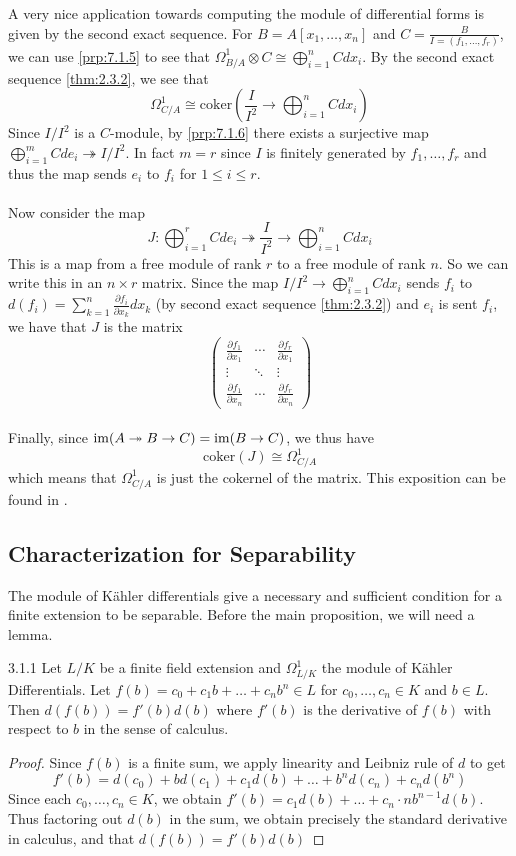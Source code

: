 \documentclass[a4paper]{article}
\begin{document}
A very nice application towards computing the module of differential forms is given by the second exact sequence. For $B=A[x_1,\dots,x_n]$ and $C=\frac{B}{I=(f_1,\dots,f_r)}$, we can use \ref{prp:7.1.5} to see that $\Omega_{B/A}^1\otimes C\cong\bigoplus_{i=1}^nCdx_i$. By the second exact sequence \ref{thm:2.3.2}, we see that $$\Omega_{C/A}^1\cong\text{coker}\left(\frac{I}{I^2}\to\bigoplus_{i=1}^nCdx_i\right)$$ Since $I/I^2$ is a $C$-module, by \ref{prp:7.1.6} there exists a surjective map $\bigoplus_{i=1}^mCde_i\twoheadrightarrow I/I^2$. In fact $m=r$ since $I$ is finitely generated by $f_1,\dots,f_r$ and thus the map sends $e_i$ to $f_i$ for $1\leq i\leq r$. \\~\\

Now consider the map $$J:\bigoplus_{i=1}^rCde_i\twoheadrightarrow\frac{I}{I^2}\rightarrow\bigoplus_{i=1}^nCdx_i$$ This is a map from a free module of rank $r$ to a free module of rank $n$. So we can write this in an $n\times r$ matrix. Since the map $I/I^2\to\bigoplus_{i=1}^nCdx_i$ sends $f_i$ to $d(f_i)=\sum_{k=1}^n\frac{\partial f_i}{\partial x_k}dx_k$ (by second exact sequence \ref{thm:2.3.2}) and $e_i$ is sent $f_i$, we have that $J$ is the matrix $$\begin{pmatrix}
\frac{\partial f_1}{\partial x_1} & \cdots & \frac{\partial f_r}{\partial x_1}\\
\vdots & \ddots & \vdots\\
\frac{\partial f_1}{\partial x_n} & \cdots & \frac{\partial f_r}{\partial x_n}
\end{pmatrix}$$~\\

Finally, since $\operatorname{im}(A\twoheadrightarrow B\to C)=\operatorname{im}(B\to C)$, we thus have $$\text{coker}(J)\cong\Omega_{C/A}^1$$ which means that $\Omega_{C/A}^1$ is just the cokernel of the matrix. This exposition can be found in \cite{Dav}. 

\subsection{Characterization for Separability}
The module of Kähler differentials give a necessary and sufficient condition for a finite extension to be separable. Before the main proposition, we will need a lemma. 

\begin{lmm}{}{3.1.1} Let $L/K$ be a finite field extension and $\Omega_{L/K}^1$ the module of Kähler Differentials. Let $f(b)=c_0+c_1b+\dots+c_nb^n\in L$ for $c_0,\dots,c_n\in K$ and $b\in L$. Then $d(f(b))=f'(b)d(b)$ where $f'(b)$ is the derivative of $f(b)$ with respect to $b$ in the sense of calculus. 
\begin{proof}
Since $f(b)$ is a finite sum, we apply linearity and Leibniz rule of $d$ to get $$f'(b)=d(c_0)+bd(c_1)+c_1d(b)+\dots+b^nd(c_n)+c_nd(b^n)$$ Since each $c_0,\dots,c_n\in K$, we obtain $f'(b)=c_1d(b)+\dots+c_n\cdot nb^{n-1}d(b)$. Thus factoring out $d(b)$ in the sum, we obtain precisely the standard derivative in calculus, and that $d(f(b))=f'(b)d(b)$
\end{proof}
\end{lmm}
\end{document}
